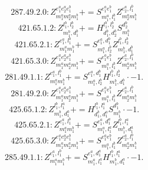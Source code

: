 \documentclass[letterpaper,10pt,fleqn,leqno,onecolumn]{article}
\begin{document}
\begin{equation} \;\;\;\;\;\;  287.49.2.0: Z^{e_{1}^{a}e_{2}^{a}e_{1}^{b}}_{m_{1}^{a}m_{2}^{a}m_{1}^{b}}+=S^{e_{1}^{a}e_{1}^{b}}_{m_{1}^{a},l_{1}^{b}}Z^{e_{2}^{a},l_{1}^{b}}_{m_{2}^{a}m_{1}^{b}} \end{equation}
\begin{equation} \;\;\;\;\;\;  421.65.1.2: Z^{l_{1}^{b},l_{2}^{b}}_{m_{1}^{b},d_{1}^{b}}+=H^{l_{1}^{b},l_{2}^{b}}_{d_{1}^{b},d_{2}^{b}}S^{d_{2}^{b}}_{m_{1}^{b}} \end{equation}
\begin{equation} \;\;\;\;\;\;  421.65.2.1: Z^{e_{1}^{a},l_{1}^{b}}_{m_{1}^{a}m_{1}^{b}}+=S^{e_{1}^{a},d_{1}^{b}}_{m_{1}^{a},l_{2}^{b}}Z^{l_{1}^{b},l_{2}^{b}}_{m_{1}^{b},d_{1}^{b}} \end{equation}
\begin{equation} \;\;\;\;\;\;  421.65.3.0: Z^{e_{1}^{a}e_{2}^{a}e_{1}^{b}}_{m_{1}^{a}m_{2}^{a}m_{1}^{b}}+=S^{e_{1}^{a}e_{1}^{b}}_{m_{1}^{a},l_{1}^{b}}Z^{e_{2}^{a},l_{1}^{b}}_{m_{2}^{a}m_{1}^{b}} \end{equation}
\begin{equation} \;\;\;\;\;\;  281.49.1.1: Z^{e_{1}^{a},l_{1}^{b}}_{m_{1}^{a}m_{1}^{b}}+=S^{e_{1}^{a},d_{1}^{b}}_{m_{1}^{a},l_{2}^{b}}H^{l_{1}^{b},l_{2}^{b}}_{m_{1}^{b},d_{1}^{b}}\cdot -1. \end{equation}
\begin{equation} \;\;\;\;\;\;  281.49.2.0: Z^{e_{1}^{a}e_{2}^{a}e_{1}^{b}}_{m_{1}^{a}m_{2}^{a}m_{1}^{b}}+=S^{e_{1}^{a}e_{1}^{b}}_{m_{1}^{a},l_{1}^{b}}Z^{e_{2}^{a},l_{1}^{b}}_{m_{2}^{a}m_{1}^{b}} \end{equation}
\begin{equation} \;\;\;\;\;\;  425.65.1.2: Z^{l_{1}^{b},l_{1}^{a}}_{m_{1}^{b},d_{1}^{a}}+=H^{l_{1}^{b},l_{1}^{a}}_{d_{1}^{b},d_{1}^{a}}S^{d_{1}^{b}}_{m_{1}^{b}}\cdot -1. \end{equation}
\begin{equation} \;\;\;\;\;\;  425.65.2.1: Z^{e_{1}^{a},l_{1}^{b}}_{m_{1}^{a}m_{1}^{b}}+=S^{e_{1}^{a},d_{1}^{a}}_{m_{1}^{a},l_{1}^{a}}Z^{l_{1}^{b},l_{1}^{a}}_{m_{1}^{b},d_{1}^{a}} \end{equation}
\begin{equation} \;\;\;\;\;\;  425.65.3.0: Z^{e_{1}^{a}e_{2}^{a}e_{1}^{b}}_{m_{1}^{a}m_{2}^{a}m_{1}^{b}}+=S^{e_{1}^{a}e_{1}^{b}}_{m_{1}^{a},l_{1}^{b}}Z^{e_{2}^{a},l_{1}^{b}}_{m_{2}^{a}m_{1}^{b}} \end{equation}
\begin{equation} \;\;\;\;\;\;  285.49.1.1: Z^{e_{1}^{a},l_{1}^{b}}_{m_{1}^{a}m_{1}^{b}}+=S^{e_{1}^{a},d_{1}^{a}}_{m_{1}^{a},l_{1}^{a}}H^{l_{1}^{b},l_{1}^{a}}_{m_{1}^{b},d_{1}^{a}}\cdot -1. \end{equation}
\end{document}
